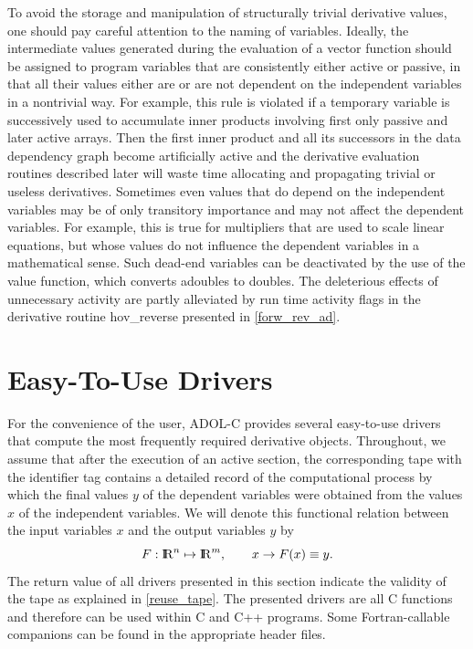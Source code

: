 \documentclass[11pt,twoside]{article}
\newcommand{\R}{{ {\rm I} \kern -.225em {\rm R} }}
\begin{document}
To avoid the storage and manipulation of structurally
trivial derivative values, one should pay careful attention to
the naming of variables. Ideally, the intermediate
values generated during the evaluation of a vector function
should be assigned to program variables that are
consistently either active or passive, in that all their values
either are or are not dependent on the independent variables
in a nontrivial way. For example, this rule is violated if a temporary
variable is successively used to accumulate inner products involving
first only passive and later active arrays. Then the first inner
product and all its successors in the data dependency graph become
artificially active and the derivative evaluation routines
described later will waste
time allocating and propagating
trivial or useless derivatives. Sometimes even values that do
depend on the independent variables may be of only transitory
importance and may not affect the dependent variables. For example,
this is true for multipliers that are used to scale linear
equations, but whose values do not influence the dependent
variables in a mathematical sense. Such dead-end variables
can be deactivated by the use of the {\sf value} function, which
converts {\sf adouble}s to {\sf double}s. The deleterious effects
of unnecessary activity are partly alleviated by run time
activity flags in the derivative routine
{\sf hov\_reverse} presented in \autoref{forw_rev_ad}.
%
%
%
\section{Easy-To-Use Drivers}
\label{drivers}
%
For the convenience of the user, ADOL-C provides several
easy-to-use drivers that compute the most frequently required
derivative objects. Throughout, we assume that after the execution of an
active section, the corresponding tape with the identifier {\sf tag}
contains a detailed record of the computational process by which the
final values $y$ of the dependent variables were obtained from the
values $x$ of the independent variables. We will denote this functional
relation between the input variables $x$ and the output variables $y$ by
\[
F : \R^n \mapsto \R^m, \qquad x \rightarrow F(x) \equiv y.
\]
The return value of all drivers presented in this section
indicate the validity of the tape as explained in \autoref{reuse_tape}.
The presented drivers are all C functions and therefore can be used within
C and C++ programs. Some Fortran-callable companions can be found
in the appropriate header files. 
%
\end{document}
